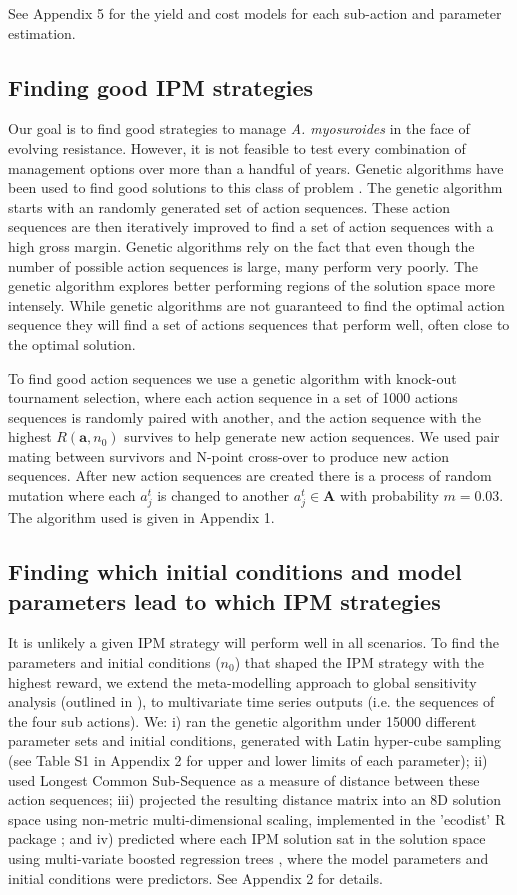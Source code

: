 \documentclass[9pt,twocolumn,twoside,lineno]{pnas-new}
\begin{document}
{See Appendix 5 for the yield and cost models for each sub-action and parameter estimation.

\subsection*{Finding good IPM strategies} 
Our goal is to find good strategies to manage \textit{A. myosuroides} in the face of evolving resistance. However, it is not feasible to test every combination of management options over more than a handful of years. Genetic algorithms have been used to find good solutions to this class of problem \citep{Tayl2004GA, Carr2010}. The genetic algorithm starts with an randomly generated set of action sequences. These action sequences are then iteratively improved to find a set of action sequences with a high gross margin. Genetic algorithms rely on the fact that even though the number of possible action sequences is large, many perform very poorly. The genetic algorithm explores better performing regions of the solution space more intensely. While genetic algorithms are not guaranteed to find the optimal action sequence they will find a set of actions sequences that perform well, often close to the optimal solution.   

To find good action sequences we use a genetic algorithm with knock-out tournament selection, where each action sequence in a set of 1000 actions sequences is randomly paired with another, and the action sequence with the highest $R(\mathbf{a}, n_0)$ survives to help generate new action sequences. We used pair mating between survivors and N-point cross-over to produce new action sequences. After new action sequences are created there is a process of random mutation where each $a_j^t$ is changed to another $a_j^t \in \mathbf{A}$ with probability $m = 0.03$. The algorithm used is given in Appendix 1.        

\subsection*{Finding which initial conditions and model parameters lead to which IPM strategies}
It is unlikely a given IPM strategy will perform well in all scenarios. To find the parameters and initial conditions ($n_0$) that shaped the IPM strategy with the highest reward, we extend the meta-modelling approach to global sensitivity analysis (outlined in \citep{Cout2014}), to multivariate time series outputs (i.e. the sequences of the four sub actions). We: i) ran the genetic algorithm under 15000 different parameter sets and initial conditions, generated with Latin hyper-cube sampling (see Table S1 in Appendix 2 for upper and lower limits of each parameter); ii) used Longest Common Sub-Sequence \citep{Tooh2015} as a measure of distance between these action sequences; iii) projected the resulting distance matrix into an 8D solution space using non-metric multi-dimensional scaling, implemented in the 'ecodist' R package \citep{Gosl2007}; and iv) predicted where each IPM solution sat in the solution space using multi-variate boosted regression trees \citep{Mill2016}, where the model parameters and initial conditions were predictors. See Appendix 2 for details.

}
\end{document}
